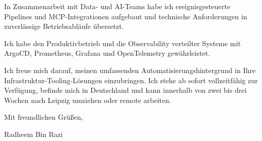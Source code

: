 \documentclass[11pt,a4paper]{coverletter}
\begin{document}
  \item In Zusammenarbeit mit Data- und AI-Teams habe ich ereignisgesteuerte Pipelines und MCP-Integrationen aufgebaut und technische Anforderungen in zuverlässige Betriebsabläufe übersetzt.

  \item Ich habe den Produktivbetrieb und die Observability verteilter Systeme mit ArgoCD, Prometheus, Grafana und OpenTelemetry gewährleistet.

\bulletsend

Ich freue mich darauf, meinen umfassenden Automatisierungshintergrund in Ihre Infrastruktur-Tooling-Lösungen einzubringen. Ich stehe ab sofort vollzeitfähig zur Verfügung, befinde mich in Deutschland und kann innerhalb von zwei bis drei Wochen nach Leipzig umziehen oder remote arbeiten.

\closing{Mit freundlichen Grüßen,}{Radheem Bin Razi}
\end{document}
